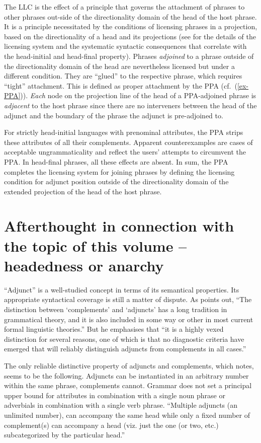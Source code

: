 \documentclass[output=paper
  ,nobabel
  ,uniformtopskip %
]{langscibook}
\begin{document}
\largerpage
The LLC is the effect of a principle that governs the attachment of phrases to other phrases out-side of the directionality domain of the head of the host phrase. It is a principle necessitated by the conditions of licensing phrases in a projection, based on the directionality of a head and its projections (see \citealp{Haider2015} for the details of the licensing system and the systematic syntactic consequences that correlate with the head-initial and head-final property). Phrases \emph{adjoined} to a phrase outside of the directionality domain of the head are nevertheless licensed but under a different condition. They are ``glued'' to the respective phrase, which requires ``tight'' attachment. This is defined as proper attachment by the PPA (cf.\ (\ref{ex-PPA})). \emph{Each} node on the projection line of the head of a PPA-adjoined phrase is \emph{adjacent} to the host phrase since there are no interveners between the head of the adjunct and the boundary of the phrase the adjunct is pre-adjoined to.

For strictly head-initial languages with prenominal attributes, the PPA strips these attributes of all their complements. Apparent counterexamples are cases of acceptable ungrammaticality and reflect the users' attempts to circumvent the PPA. In head-final phrases, all these effects are absent. In sum, the PPA completes the licensing system for joining phrases by defining the licensing condition for adjunct position outside of the directionality domain of the extended projection of the head of the host phrase.

\section{Afterthought in connection with the topic of this volume – headedness or anarchy}

\largerpage
``Adjunct'' is a well-studied concept in terms of its semantical properties. Its appropriate syntactical coverage is still a matter of dispute. As \citet*[33]{Dowty2003a} points out, ``The distinction between `complements' and `adjuncts' has a long tradition in grammatical theory, and it is also included in some way or other in most current formal linguistic theories.'' But he emphasises that ``it is a highly vexed distinction for several reasons, one of which is that no diagnostic criteria have emerged that will reliably distinguish adjuncts from complements in all cases.''

The only reliable distinctive property of adjuncts and complements, which \citet{Dowty2003a} notes, seems to be the following. Adjuncts can be instantiated in an arbitrary number within the same phrase, complements cannot. Grammar does not set a principal upper bound for attributes in combination with a single noun phrase or adverbials in combination with a single verb phrase. ``Multiple adjuncts (an unlimited number), can accompany the same head while only a fixed number of complement(s) can accompany a head (viz. just the one (or two, etc.) subcategorized by the particular head.'' \citep[39]{Dowty2003a}
\end{document}

